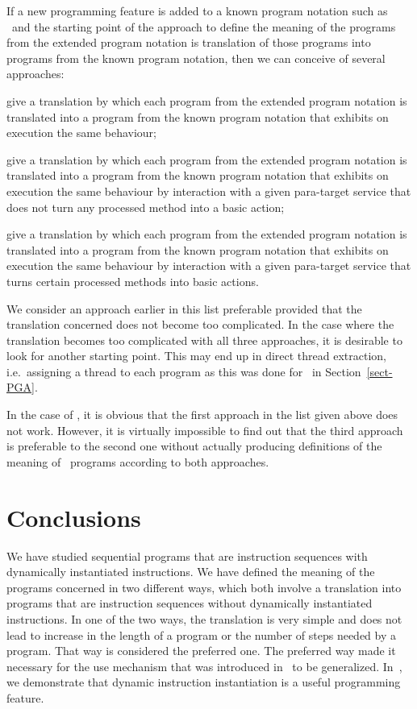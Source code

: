 \documentclass[fleqn]{llncs}
\begin{document}
If a new programming feature is added to a known program notation such
as \PGLD\ and the starting point of the approach to define the meaning
of the programs from the extended program notation is translation of
those programs into programs from the known program notation, then we
can conceive of several approaches:
\begin{iteml}
\item
give a translation by which each program from the extended program
notation is translated into a program from the known program notation
that exhibits on execution the same behaviour;
\item
give a translation by which each program from the extended program
notation is translated into a program from the known program notation
that exhibits on execution the same behaviour by interaction with a
given para-target service that does not turn any processed method into a
basic action;
\item
give a translation by which each program from the extended program
notation is translated into a program from the known program notation
that exhibits on execution the same behaviour by interaction with a
given para-target service that turns certain processed methods into
basic actions.
\end{iteml}
We consider an approach earlier in this list preferable provided that
the translation concerned does not become too complicated.
In the case where the translation becomes too complicated with all three
approaches, it is desirable to look for another starting point.
This may end up in direct thread extraction, i.e.\ assigning a thread to
each program as this was done for \PGA\ in Section~\ref{sect-PGA}.

In the case of \PGLDdii, it is obvious that the first approach in the
list given above does not work.
However, it is virtually impossible to find out that the third approach
is preferable to the second one without actually producing definitions
of the meaning of \PGLDdii\ programs according to both approaches.

\section{Conclusions}
\label{sect-concl}

We have studied sequential programs that are instruction sequences with
dynamically instantiated instructions.
We have defined the meaning of the programs concerned in two different
ways, which both involve a translation into programs that are
instruction sequences without dynamically instantiated instructions.
In one of the two ways, the translation is very simple and does not lead
to increase in the length of a program or the number of steps needed by
a program.
That way is considered the preferred one.
The preferred way made it necessary for the use mechanism that was
introduced in~\cite{BM04c} to be generalized.
In~\cite{BM08a}, we demonstrate that dynamic instruction instantiation
is a useful programming feature.
\end{document}
